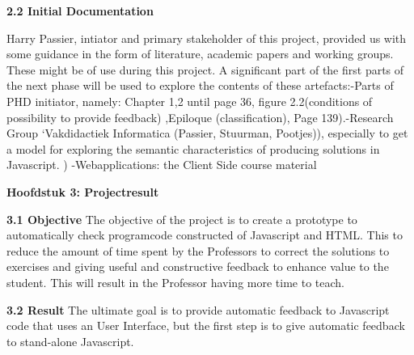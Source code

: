 \documentclass{article}
\begin{document}
\textbf{2.2 Initial Documentation}

\noindent
Harry Passier, intiator and primary stakeholder of this project, provided us with some guidance in the form of literature, academic papers and working groups. These might be of use during this project. A significant part of the first parts of the next phase will be used to explore the contents of these artefacts:\newline -Parts of PHD initiator, namely: Chapter 1,2 until page 36, figure 2.2(conditions of possibility to provide feedback) ,Epiloque (classification), Page 139).\newline -Research Group ‘Vakdidactiek Informatica (Passier, Stuurman, Pootjes)), especially to get a model for exploring the semantic characteristics of producing solutions in Javascript. ) \newline -Webapplications: the Client Side course material

\textbf{Hoofdstuk 3: Projectresult}
\newline

\noindent
\textbf{3.1 Objective}
\newline
The objective of the project is to create a prototype to automatically check programcode constructed of Javascript and HTML. This to reduce the amount of time spent by the Professors to correct the solutions to exercises and giving useful and constructive feedback to enhance value to the student. 
This will result in the Professor having more time to teach. 
\newline

\noindent
\textbf{3.2 Result}
\newline
The ultimate goal is to provide automatic feedback to Javascript code that uses an User Interface, but the first step is to give automatic feedback to stand-alone Javascript.
\newline
\end{document}
